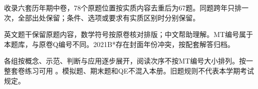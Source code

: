 收录六套历年期中卷，78个原题位置按实质内容去重后为67题。同题跨年只排一次，全部出处保留；条件、选项或要求有实质区别时分别保留。


英文题干保留原题内容，数学符号按原卷核对排版；中文帮助理解。MT编号属于本题库，与原卷Q编号不同。2021B*存在封面年份冲突，按配套解答归档。


各组按概念、示范、判断与应用逐步展开，阅读次序不按MT编号大小排列。按一整套卷练习可用 。模拟题、期末题和QE不混入本册。旧题规则不代表本学期考试规定。
